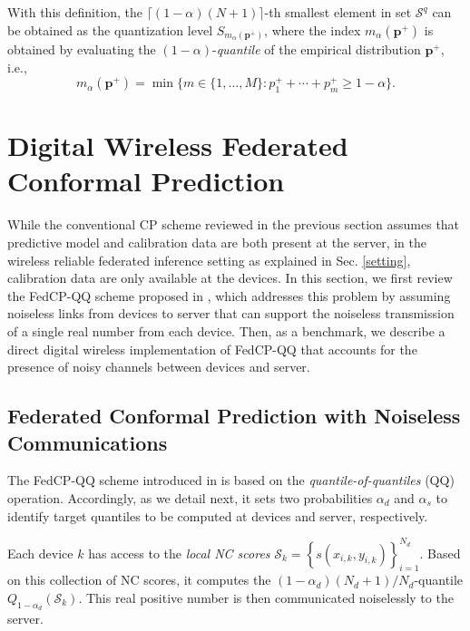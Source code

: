 \documentclass[12pt, draftclsnofoot, onecolumn]{IEEEtran}
\begin{document}
With this definition, the $\lceil(1-\alpha)(N+1)\rceil$-th smallest element in set $\mathcal{S}^q$ can be obtained as the quantization level $S_{m_{\alpha}(\boldsymbol{p}^+)}$, where the index $m_{\alpha}(\boldsymbol{p}^+)$ is obtained by evaluating the $(1-\alpha)$-\emph{quantile} of the empirical distribution $\boldsymbol{p}^{+}$, i.e.,
\begin{equation}\label{index}
    m_{\alpha} (\boldsymbol{p}^{+})= \min \bigg\{m \in \{1,\ldots,M\}: p^{+}_1 + \cdots + p^{+}_m \geq 1-\alpha \bigg\}.
\end{equation}


\section{Digital Wireless Federated Conformal Prediction}\label{digital_CP}
While the conventional CP scheme reviewed in the previous section assumes that predictive model and calibration data are both present at the server, in the wireless reliable federated inference setting as explained in Sec. \ref{setting}, calibration data are only available at the devices. In this section, we first review the FedCP-QQ scheme proposed in \cite{FedCP-QQ}, which addresses this problem by assuming noiseless links from devices to server that can support the noiseless transmission of a single real number from each device. Then, as a benchmark, we describe a direct digital wireless implementation of FedCP-QQ that accounts for the presence of noisy channels between devices and server.

\subsection{Federated Conformal Prediction with Noiseless Communications}\label{FedCPQQ}
The FedCP-QQ scheme introduced in \cite{FedCP-QQ} is based on the \emph{quantile-of-quantiles} (QQ) operation. Accordingly, as we detail next, it sets two probabilities $\alpha_d$ and $\alpha_s$ to identify target quantiles to be computed at devices and server, respectively.

Each device $k$ has access to the \emph{local NC scores} $\mathcal{S}_k= \left\{s(x_{i,k}, y_{i,k})\right\}_{i=1}^{N_d}$. Based on this collection of NC scores, it computes the $(1-\alpha_d)(N_d+1)/N_d$-quantile $Q_{1-\alpha_d}(\mathcal{S}_k)$. This real positive number is then communicated noiselessly to the server.
\end{document}
